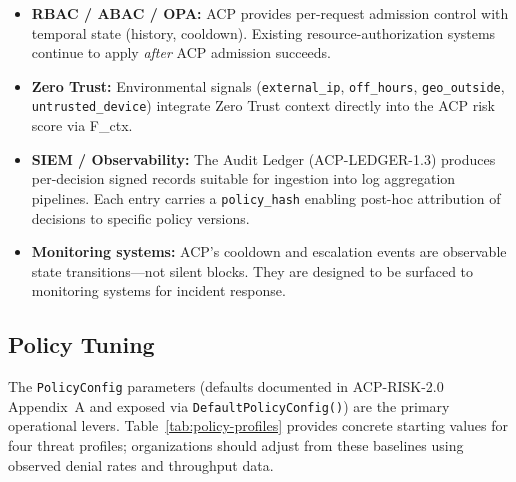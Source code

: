 \documentclass[11pt]{article}
\theoremstyle{definition}
\begin{document}
\begin{itemize}[noitemsep]
  \item \textbf{RBAC / ABAC / OPA:} ACP provides per-request admission control with
    temporal state (history, cooldown). Existing resource-authorization systems
    continue to apply \emph{after} ACP admission succeeds.
  \item \textbf{Zero Trust:} Environmental signals (\texttt{external\_ip},
    \texttt{off\_hours}, \texttt{geo\_outside}, \texttt{untrusted\_device})
    integrate Zero Trust context directly into the ACP risk score via F\_ctx.
  \item \textbf{SIEM / Observability:} The Audit Ledger (ACP-LEDGER-1.3) produces
    per-decision signed records suitable for ingestion into log aggregation pipelines.
    Each entry carries a \texttt{policy\_hash} enabling post-hoc attribution of
    decisions to specific policy versions.
  \item \textbf{Monitoring systems:} ACP's cooldown and escalation events are
    observable state transitions---not silent blocks. They are designed to be
    surfaced to monitoring systems for incident response.
\end{itemize}

\subsection{Policy Tuning}

The \texttt{PolicyConfig} parameters (defaults documented in ACP-RISK-2.0 Appendix~A
and exposed via \texttt{DefaultPolicyConfig()}) are the primary operational levers.
Table~\ref{tab:policy-profiles} provides concrete starting values for four
threat profiles; organizations should adjust from these baselines using
observed denial rates and throughput data.
\end{document}
